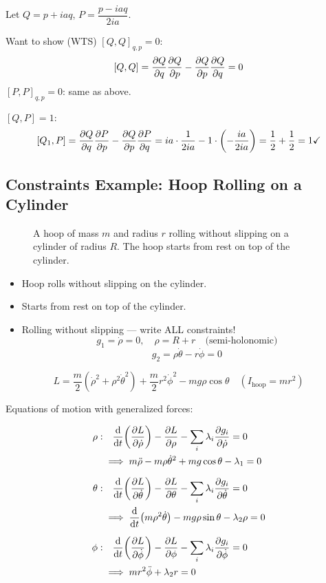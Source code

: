 \begin{example}
Let $Q = p + iaq$, $P = \dfrac{p - iaq}{2ia}$.

Want to show (WTS) $[Q,Q]_{q,p} = 0$:
\[
    [Q,Q] = \pdv{Q}{q}\pdv{Q}{p} - \pdv{Q}{p}\pdv{Q}{q} = 0
\]
$[P,P]_{q,p} = 0$: same as above.

$[Q,P] = 1$:
\[
    [Q_1, P] = \pdv{Q}{q}\pdv{P}{p} - \pdv{Q}{p}\pdv{P}{q}
    = ia\cdot\frac{1}{2ia} - 1\cdot\left(-\frac{ia}{2ia}\right)
    = \frac{1}{2} + \frac{1}{2} = 1\checkmark
\]
\end{example}

\subsection{Constraints Example: Hoop Rolling on a Cylinder}

\begin{figure}[H]
    \centering
    \caption{A hoop of mass $m$ and radius $r$ rolling without slipping on a cylinder of radius $R$. The hoop starts from rest on top of the cylinder.}
\end{figure}

\begin{itemize}
    \item Hoop rolls without slipping on the cylinder.
    \item Starts from rest on top of the cylinder.
    \item Rolling without slipping --- write ALL constraints!
    \[
        g_1 = \dot{\rho} = 0,\quad \rho = R + r\quad\text{(semi-holonomic)}
    \]
    \[
        g_2 = \rho\dot{\theta} - r\dot{\phi} = 0
    \]
\end{itemize}

\[
    L = \frac{m}{2}(\dot{\rho}^2 + \rho^2\dot{\theta}^2) + \frac{m}{2}r^2\dot{\phi}^2 - mg\rho\cos\theta
    \quad (I_{\text{hoop}} = mr^2)
\]

Equations of motion with generalized forces:

\begin{align*}
    \rho:&\quad\dv{t}\!\left(\pdv{L}{\dot{\rho}}\right) - \pdv{L}{\rho} - \sum_i\lambda_i\pdv{g_i}{\dot{\rho}} = 0\\
    &\implies m\ddot{\rho} - m\rho\dot{\theta}^2 + mg\cos\theta - \lambda_1 = 0\\[6pt]
    \theta:&\quad\dv{t}\!\left(\pdv{L}{\dot{\theta}}\right) - \pdv{L}{\theta} - \sum_i\lambda_i\pdv{g_i}{\dot{\theta}} = 0\\
    &\implies \dv{t}(m\rho^2\dot{\theta}) - mg\rho\sin\theta - \lambda_2\rho = 0\\[6pt]
    \phi:&\quad\dv{t}\!\left(\pdv{L}{\dot{\phi}}\right) - \pdv{L}{\phi} - \sum_i\lambda_i\pdv{g_i}{\dot{\phi}} = 0\\
    &\implies mr^2\ddot{\phi} + \lambda_2 r = 0
\end{align*}

